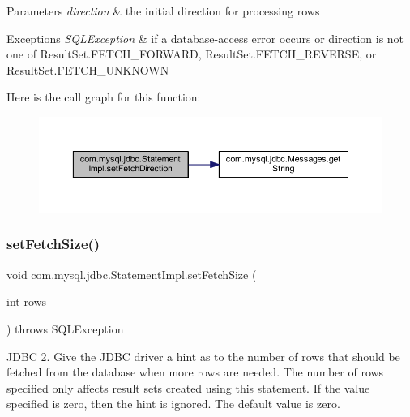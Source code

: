 \begin{DoxyParams}{Parameters}
{\em direction} & the initial direction for processing rows\\
\hline
\end{DoxyParams}

\begin{DoxyExceptions}{Exceptions}
{\em S\+Q\+L\+Exception} & if a database-\/access error occurs or direction is not one of Result\+Set.\+F\+E\+T\+C\+H\+\_\+\+F\+O\+R\+W\+A\+RD, Result\+Set.\+F\+E\+T\+C\+H\+\_\+\+R\+E\+V\+E\+R\+SE, or Result\+Set.\+F\+E\+T\+C\+H\+\_\+\+U\+N\+K\+N\+O\+WN \\
\hline
\end{DoxyExceptions}
Here is the call graph for this function\+:
\nopagebreak
\begin{figure}[H]
\begin{center}
\leavevmode
\includegraphics[width=350pt]{classcom_1_1mysql_1_1jdbc_1_1_statement_impl_aebc30908694e5ae2bc3cec1738bbf2e4_cgraph}
\end{center}
\end{figure}
\mbox{\label{classcom_1_1mysql_1_1jdbc_1_1_statement_impl_a5e92dd77e4ff9bf65cff4f50e63a1045}} 
\subsubsection{\texorpdfstring{set\+Fetch\+Size()}{setFetchSize()}}
{\footnotesize\ttfamily void com.\+mysql.\+jdbc.\+Statement\+Impl.\+set\+Fetch\+Size (\begin{DoxyParamCaption}\item[{int}]{rows }\end{DoxyParamCaption}) throws S\+Q\+L\+Exception}

J\+D\+BC 2. Give the J\+D\+BC driver a hint as to the number of rows that should be fetched from the database when more rows are needed. The number of rows specified only affects result sets created using this statement. If the value specified is zero, then the hint is ignored. The default value is zero.


